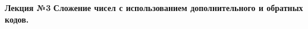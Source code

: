 \LARGE{ \textbf {Лекция №3}}
\Large{ \textbf {Сложение чисел с использованием дополнительного и обратных кодов.}}
